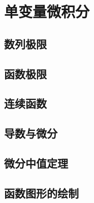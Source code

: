 \part{单变量微积分}

\chapter{数列极限}








\chapter{函数极限}









\chapter{连续函数}





% 
% 

\chapter{导数与微分}\label{chapter:导数}







\chapter{微分中值定理}





\chapter{函数图形的绘制}






